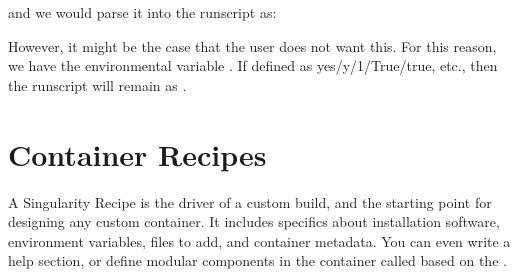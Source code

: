\documentclass[letterpaper,10pt,english]{sphinxmanual}
\begin{document}
%
\begin{sphinxVerbatim}[commandchars=\\\{\}]
\end{sphinxVerbatim}

and we would parse it into the runscript as:

%
\begin{sphinxVerbatim}[commandchars=\\\{\}]
  
\end{sphinxVerbatim}

However, it might be the case that the user does not want this. For this
reason, we have the environmental variable . If defined as
yes/y/1/True/true, etc., then the runscript will remain as .


\chapter{Container Recipes}
\label{\detokenize{container_recipes:container-recipes}}\label{\detokenize{container_recipes:id1}}\label{\detokenize{container_recipes::doc}}\label{\detokenize{container_recipes:sec-recipefile}}
A Singularity Recipe is the driver of a custom build, and the starting
point for designing any custom container. It includes specifics about
installation software, environment variables, files to add, and
container metadata. You can even write a help section, or define modular
components in the container called based on the .
\end{document}
